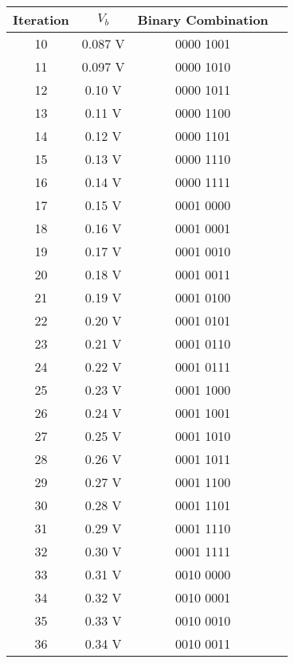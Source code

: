 \begin{center}
\begin{tabular}{c c c c}
\toprule \toprule
\hspace{40px} Iteration \hspace{40px} & \hspace{30px} $V_{b}$ \hspace{30px} & \hspace{30px} Binary Combination \hspace{30px} \\
\midrule \midrule
10 & 0.087 V & 0000 1001 & \\
\midrule
11 & 0.097 V & 0000 1010 & \\
\midrule
12 & 0.10 V & 0000 1011& \\
\midrule
13 & 0.11 V & 0000 1100 & \\
\midrule
14 & 0.12 V & 0000 1101 & \\
\midrule
15 & 0.13 V & 0000 1110 & \\
\midrule
16 & 0.14 V & 0000 1111 & \\
\midrule
17 & 0.15 V & 0001 0000 & \\
\midrule
18 & 0.16 V & 0001 0001 & \\
\midrule
19 & 0.17 V & 0001 0010 & \\
\midrule
20 & 0.18 V & 0001 0011 & \\
\midrule
21 & 0.19 V & 0001 0100 & \\
\midrule
22 & 0.20 V & 0001 0101 & \\
\midrule
23 & 0.21 V & 0001 0110 & \\
\midrule
24 & 0.22 V & 0001 0111 & \\
\midrule
25 & 0.23 V & 0001 1000 & \\
\midrule
26 & 0.24 V & 0001 1001 & \\
\midrule
27 & 0.25 V & 0001 1010 & \\
\midrule
28 & 0.26 V & 0001 1011 & \\
\midrule
29 & 0.27 V & 0001 1100 & \\
\midrule
30 & 0.28 V & 0001 1101 & \\
\midrule
31 & 0.29 V & 0001 1110 & \\
\midrule
32 & 0.30 V & 0001 1111 & \\
\midrule
33 & 0.31 V & 0010 0000 & \\
\midrule
34 & 0.32 V & 0010 0001 & \\
\midrule
35 & 0.33 V & 0010 0010 & \\
\midrule
36 & 0.34 V & 0010 0011 & \\

\end{tabular}
\end{center}
